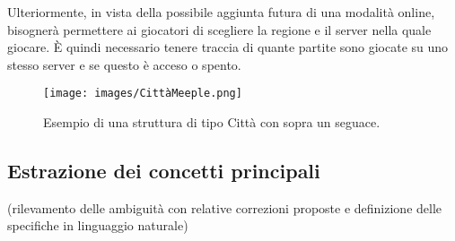 Ulteriormente, in vista della possibile aggiunta futura di una modalità online, bisognerà permettere ai giocatori di scegliere la regione e il server nella quale giocare. È quindi necessario tenere traccia di quante partite sono giocate su uno stesso server e se questo è acceso o spento.

\begin{figure}[ht]
    \centering\texttt{[image: images/CittàMeeple.png]}
    \caption{Esempio di una struttura di tipo Città con sopra un seguace.}
\end{figure}

\subsection{Estrazione dei concetti principali}
(rilevamento delle ambiguità con relative correzioni proposte e definizione delle specifiche in linguaggio naturale)

